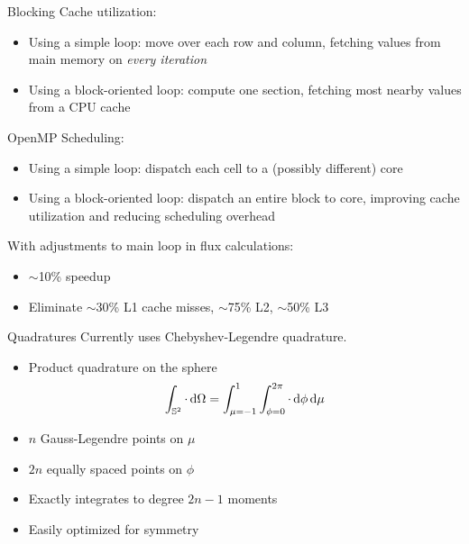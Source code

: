 \documentclass{beamer}
\begin{document}
    \begin{frame}{Blocking}
        Cache utilization:
        \begin{itemize}
            \item Using a simple loop: move over each row and column, fetching values from main memory on \emph{every iteration}
            \item Using a block-oriented loop: compute one section, fetching most nearby values from a CPU cache
        \end{itemize}

        \vfill

        OpenMP Scheduling:
        \begin{itemize}
            \item Using a simple loop: dispatch each cell to a (possibly different) core
            \item Using a block-oriented loop: dispatch an entire block to core, improving cache utilization and reducing scheduling overhead
        \end{itemize}

        \vfill

        With adjustments to main loop in flux calculations:
        \begin{itemize}
            \item $\sim$10\% speedup
            \item Eliminate $\sim$30\% L1 cache misses, $\sim$75\% L2, $\sim$50\% L3
        \end{itemize}
    \end{frame}

    \begin{frame}{Quadratures}
        Currently uses Chebyshev-Legendre quadrature.
        \begin{itemize}
            \item Product quadrature on the sphere \[\int_{\mathbb{S}^2} \cdot \dif \Omega = \int_{\mu=-1}^1 \int_{\phi=0}^{2\pi} \cdot \dif \phi \dif \mu\]
            \item $n$ Gauss-Legendre points on $\mu$
            \item $2n$ equally spaced points on $\phi$
            \item Exactly integrates to degree $2n - 1$ moments
            \item Easily optimized for symmetry
        \end{itemize}
    \end{frame}
\end{document}
